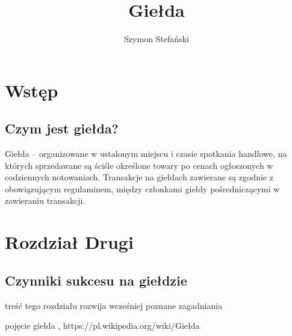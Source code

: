 \documentclass{report}
\title{Giełda}
\author{Szymon Stefański}
\begin{document}
\maketitle
\tableofcontents
\newpage
\section{Wstęp}
\subsection{Czym jest giełda?}
Giełda – organizowane w ustalonym miejscu i czasie spotkania handlowe, na których sprzedawane są ściśle określone towary po cenach ogłoszonych w codziennych notowaniach. Transakcje na giełdach zawierane są zgodnie z obowiązującym regulaminem, między członkami giełdy pośredniczącymi w zawieraniu transakcji. 
\newpage
\section{Rozdział Drugi}
\subsection{Czynniki sukcesu na giełdzie}
treść tego rozdziału rozwija wcześniej poznane zagadniania
\newpage
\begin{thebibliography}{99}
pojęcie giełda
\emph{},
https://pl.wikipedia.org/wiki/Giełda
\end{thebibliography}
\end{document}
